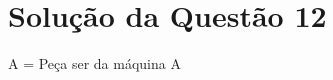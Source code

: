 \documentclass[
	12pt,				%
	openright,			%
	twoside,			%
	a4paper,			%
	english,			%
	french,				%
	spanish,			%
	brazil,				%
	]{abntex2}
\begin{document}





\section{Solução da Questão 12}
A = Peça ser da máquina A
\end{document}
